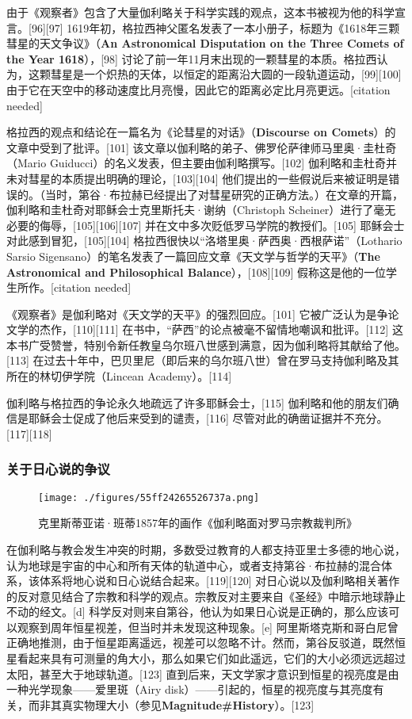 由于《观察者》包含了大量伽利略关于科学实践的观点，这本书被视为他的科学宣言。[96][97] 1619年初，格拉西神父匿名发表了一本小册子，标题为《1618年三颗彗星的天文争议》（\textbf{An Astronomical Disputation on the Three Comets of the Year 1618}），[98] 讨论了前一年11月末出现的一颗彗星的本质。格拉西认为，这颗彗星是一个炽热的天体，以恒定的距离沿大圆的一段轨道运动，[99][100] 由于它在天空中的移动速度比月亮慢，因此它的距离必定比月亮更远。[citation needed]  

格拉西的观点和结论在一篇名为《论彗星的对话》（\textbf{Discourse on Comets}）的文章中受到了批评。[101] 该文章以伽利略的弟子、佛罗伦萨律师马里奥·圭杜奇（Mario Guiducci）的名义发表，但主要由伽利略撰写。[102] 伽利略和圭杜奇并未对彗星的本质提出明确的理论，[103][104] 他们提出的一些假说后来被证明是错误的。（当时，第谷·布拉赫已经提出了对彗星研究的正确方法。）在文章的开篇，伽利略和圭杜奇对耶稣会士克里斯托夫·谢纳（Christoph Scheiner）进行了毫无必要的侮辱，[105][106][107] 并在文中多次贬低罗马学院的教授们。[105] 耶稣会士对此感到冒犯，[105][104] 格拉西很快以“洛塔里奥·萨西奥·西根萨诺”（Lothario Sarsio Sigensano）的笔名发表了一篇回应文章《天文学与哲学的天平》（\textbf{The Astronomical and Philosophical Balance}），[108][109] 假称这是他的一位学生所作。[citation needed]  

《观察者》是伽利略对《天文学的天平》的强烈回应。[101] 它被广泛认为是争论文学的杰作，[110][111] 在书中，“萨西”的论点被毫不留情地嘲讽和批评。[112] 这本书广受赞誉，特别令新任教皇乌尔班八世感到满意，因为伽利略将其献给了他。[113] 在过去十年中，巴贝里尼（即后来的乌尔班八世）曾在罗马支持伽利略及其所在的林切伊学院（Lincean Academy）。[114]  

伽利略与格拉西的争论永久地疏远了许多耶稣会士，[115] 伽利略和他的朋友们确信是耶稣会士促成了他后来受到的谴责，[116] 尽管对此的确凿证据并不充分。[117][118]
\subsubsection{关于日心说的争议}
\begin{figure}[ht]
\centering
\texttt{[image: ./figures/55ff24265526737a.png]}
\caption{克里斯蒂亚诺·班蒂1857年的画作《伽利略面对罗马宗教裁判所》} \label{fig_JLL_8}
\end{figure}
在伽利略与教会发生冲突的时期，多数受过教育的人都支持亚里士多德的地心说，认为地球是宇宙的中心和所有天体的轨道中心，或者支持第谷·布拉赫的混合体系，该体系将地心说和日心说结合起来。[119][120] 对日心说以及伽利略相关著作的反对意见结合了宗教和科学的观点。宗教反对主要来自《圣经》中暗示地球静止不动的经文。[d] 科学反对则来自第谷，他认为如果日心说是正确的，那么应该可以观察到周年恒星视差，但当时并未发现这种现象。[e] 阿里斯塔克斯和哥白尼曾正确地推测，由于恒星距离遥远，视差可以忽略不计。然而，第谷反驳道，既然恒星看起来具有可测量的角大小，那么如果它们如此遥远，它们的大小必须远远超过太阳，甚至大于地球轨道。[123] 直到后来，天文学家才意识到恒星的视亮度是由一种光学现象——爱里斑（Airy disk）——引起的，恒星的视亮度与其亮度有关，而非其真实物理大小（参见\textbf{Magnitude#History}）。[123]  

